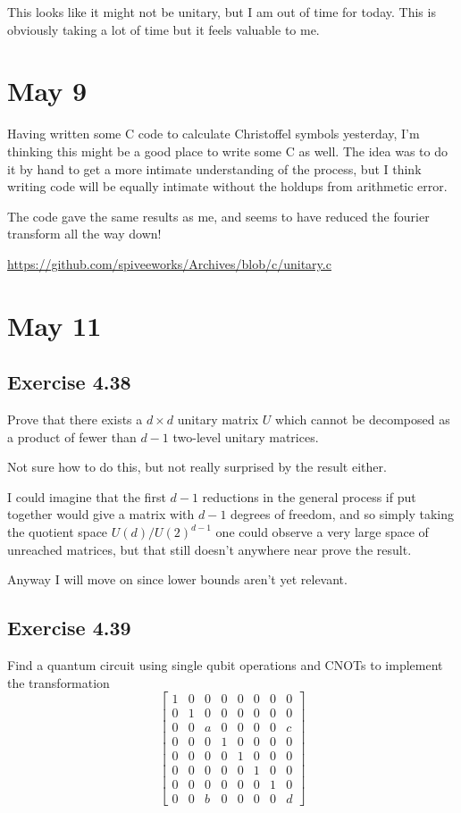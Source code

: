 \documentclass[]{article}
\begin{document}
This looks like it might not be unitary, but I am out of time for today.
This is obviously taking a lot of time but it feels valuable to me.

\section{May 9}

Having written some C code to calculate Christoffel symbols yesterday, I'm thinking this might be a good place to write some C as well. The idea was to do it by hand to get a more intimate understanding of the process, but I think writing code will be equally intimate without the holdups from arithmetic error.

The code gave the same results as me, and seems to have reduced the fourier transform all the way down!

\url{https://github.com/spiveeworks/Archives/blob/c/unitary.c}

\section{May 11}

\subsection{Exercise 4.38}

Prove that there exists a $d\times d$ unitary matrix $U$ which cannot be decomposed as a product of fewer than $d-1$ two-level unitary matrices.

Not sure how to do this, but not really surprised by the result either.

I could imagine that the first $d-1$ reductions in the general process if put together would give a matrix with $d-1$ degrees of freedom, and so simply taking the quotient space $U(d)/U(2)^{d-1}$ one could observe a very large space of unreached matrices, but that still doesn't anywhere near prove the result.

Anyway I will move on since lower bounds aren't yet relevant.

\subsection{Exercise 4.39}

Find a quantum circuit using single qubit operations and CNOTs to implement the transformation
\[\left[\begin{matrix}
1&0&0&0&0&0&0&0\\
0&1&0&0&0&0&0&0\\
0&0&a&0&0&0&0&c\\
0&0&0&1&0&0&0&0\\
0&0&0&0&1&0&0&0\\
0&0&0&0&0&1&0&0\\
0&0&0&0&0&0&1&0\\
0&0&b&0&0&0&0&d
\end{matrix}\right]\]
\end{document}
